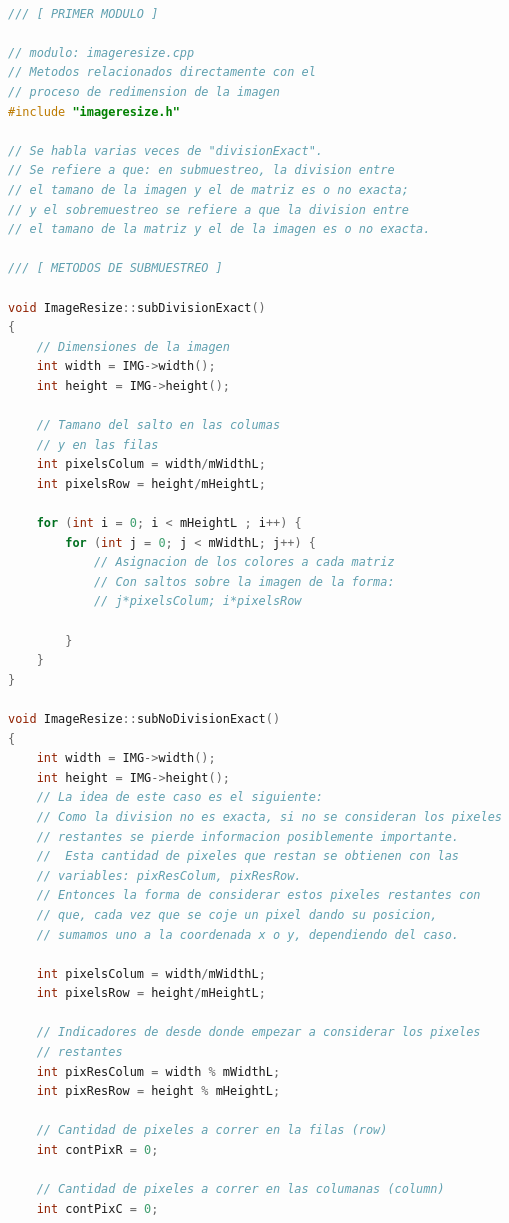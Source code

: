 \documentclass{article}
\begin{document}
\begin{lstlisting}[language=C++, label=codigo_matrices_int]

/// [ PRIMER MODULO ]

// modulo: imageresize.cpp
// Metodos relacionados directamente con el 
// proceso de redimension de la imagen
#include "imageresize.h"

// Se habla varias veces de "divisionExact". 
// Se refiere a que: en submuestreo, la division entre 
// el tamano de la imagen y el de matriz es o no exacta; 
// y el sobremuestreo se refiere a que la division entre
// el tamano de la matriz y el de la imagen es o no exacta.

/// [ METODOS DE SUBMUESTREO ]

void ImageResize::subDivisionExact()
{
    // Dimensiones de la imagen
    int width = IMG->width();
    int height = IMG->height();
    
    // Tamano del salto en las columas 
    // y en las filas
    int pixelsColum = width/mWidthL;
    int pixelsRow = height/mHeightL;

    for (int i = 0; i < mHeightL ; i++) {
        for (int j = 0; j < mWidthL; j++) {
            // Asignacion de los colores a cada matriz
            // Con saltos sobre la imagen de la forma: 
            // j*pixelsColum; i*pixelsRow
            
        }
    }
}

void ImageResize::subNoDivisionExact()
{
    int width = IMG->width();
    int height = IMG->height();
    // La idea de este caso es el siguiente:
    // Como la division no es exacta, si no se consideran los pixeles
    // restantes se pierde informacion posiblemente importante.
    //  Esta cantidad de pixeles que restan se obtienen con las 
    // variables: pixResColum, pixResRow.
    // Entonces la forma de considerar estos pixeles restantes con
    // que, cada vez que se coje un pixel dando su posicion,
    // sumamos uno a la coordenada x o y, dependiendo del caso.

    int pixelsColum = width/mWidthL;
    int pixelsRow = height/mHeightL;

    // Indicadores de desde donde empezar a considerar los pixeles
    // restantes
    int pixResColum = width % mWidthL;
    int pixResRow = height % mHeightL;

    // Cantidad de pixeles a correr en la filas (row)
    int contPixR = 0; 
    
    // Cantidad de pixeles a correr en las columanas (column)
    int contPixC = 0; 
    

\end{lstlisting}
\end{document}
